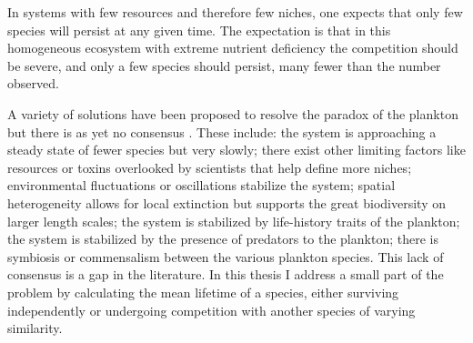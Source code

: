 In systems with few resources and therefore few niches, one expects that only few species will persist at any given time.
The expectation is that in this homogeneous ecosystem with extreme nutrient deficiency the competition should be severe, and only a few species should persist, many fewer than the number observed. 

A variety of solutions have been proposed to resolve the paradox of the plankton but there is as yet no consensus \cite{Roy2007}.
These include: the system is approaching a steady state of fewer species but very slowly; there exist other limiting factors like resources or toxins overlooked by scientists that help define more niches; environmental fluctuations or oscillations stabilize the system; spatial heterogeneity allows for local extinction but supports the great biodiversity on larger length scales; the system is stabilized by life-history traits of the plankton; the system is stabilized by the presence of predators to the plankton; there is symbiosis or commensalism between the various plankton species. 
This lack of consensus is a gap in the literature. 
In this thesis I address a small part of the problem by calculating the mean lifetime of a species, either surviving independently or undergoing competition with another species of varying similarity. 

